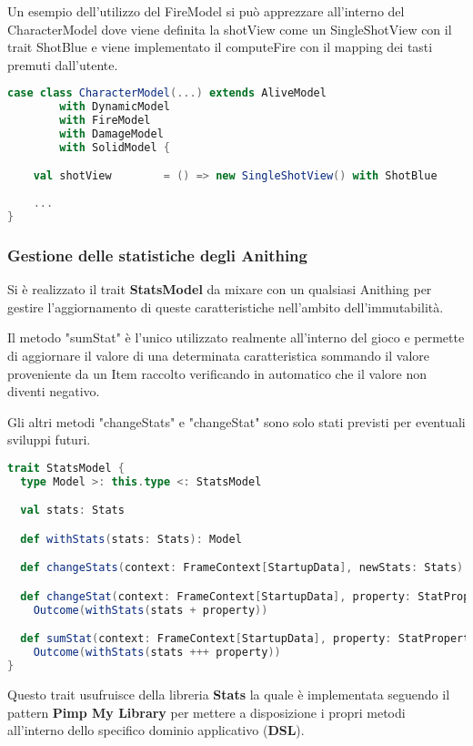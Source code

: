 Un esempio dell'utilizzo del FireModel si può apprezzare all'interno del CharacterModel 
dove viene definita la shotView come un SingleShotView con il trait ShotBlue
e viene implementato il computeFire con il mapping dei tasti premuti dall'utente.

\begin{lstlisting}[language=Scala]
case class CharacterModel(...) extends AliveModel
		with DynamicModel
		with FireModel
		with DamageModel
		with SolidModel {

	val shotView        = () => new SingleShotView() with ShotBlue
	
	...
}
\end{lstlisting}

\subsubsection{Gestione delle statistiche degli Anithing}
Si è realizzato il trait \textbf{StatsModel} da mixare con un qualsiasi Anithing 
per gestire l'aggiornamento di queste caratteristiche nell'ambito dell'immutabilità.

Il metodo "sumStat" è l'unico utilizzato realmente all'interno del gioco e permette di 
aggiornare il valore di una determinata caratteristica sommando il valore proveniente da un Item raccolto 
verificando in automatico che il valore non diventi negativo.

Gli altri metodi "changeStats" e "changeStat" sono solo stati previsti per eventuali sviluppi futuri.  

\begin{lstlisting}[language=Scala]
trait StatsModel {
  type Model >: this.type <: StatsModel

  val stats: Stats

  def withStats(stats: Stats): Model

  def changeStats(context: FrameContext[StartupData], newStats: Stats): Outcome[Model] = Outcome(withStats(newStats))

  def changeStat(context: FrameContext[StartupData], property: StatProperty): Outcome[Model] =
    Outcome(withStats(stats + property))

  def sumStat(context: FrameContext[StartupData], property: StatProperty): Outcome[Model] =
    Outcome(withStats(stats +++ property))
}
\end{lstlisting}

Questo trait usufruisce della libreria \textbf{Stats} la quale è implementata seguendo il pattern \textbf{Pimp My Library} 
per mettere a disposizione i propri metodi all'interno dello specifico dominio applicativo (\textbf{DSL}).

